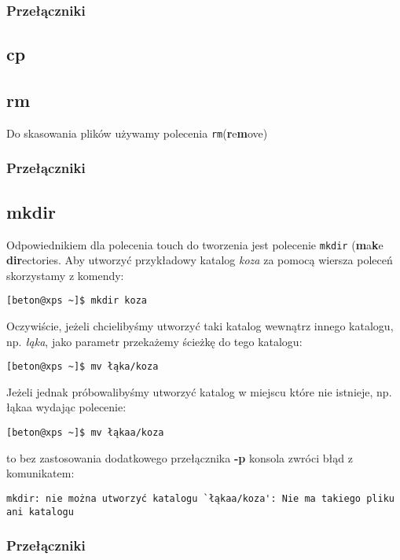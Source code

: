 \documentclass[10 pt, a4paper, draft]{report}
\begin{document}
\subsubsection*{Przełączniki}

\subsection{cp}

\subsection{rm}
Do skasowania plików używamy polecenia \texttt{rm}(\textbf{r}e\textbf{m}ove)
\subsubsection*{Przełączniki}

\subsection{mkdir}
Odpowiednikiem dla polecenia touch do tworzenia jest polecenie \texttt{mkdir} (\textbf{m}a\textbf{k}e \textbf{dir}ectories. Aby utworzyć przykładowy katalog \textit{koza} za pomocą wiersza poleceń skorzystamy z komendy:
\begin{verbatim}
[beton@xps ~]$ mkdir koza
\end{verbatim}
Oczywiście, jeżeli chcielibyśmy utworzyć taki katalog wewnątrz innego katalogu, np. \textit{łąka}, jako parametr przekażemy ścieżkę do tego katalogu:
\begin{verbatim}
[beton@xps ~]$ mv łąka/koza
\end{verbatim}
Jeżeli jednak próbowalibyśmy utworzyć katalog w miejscu które nie istnieje, np. łąkaa wydając polecenie:
\begin{verbatim}
[beton@xps ~]$ mv łąkaa/koza
\end{verbatim}
to bez zastosowania dodatkowego przełącznika \textbf{-p} konsola zwróci błąd z komunikatem:
\begin{verbatim}
mkdir: nie można utworzyć katalogu `łąkaa/koza': Nie ma takiego pliku ani katalogu
\end{verbatim}
\subsubsection*{Przełączniki}
\end{document}
